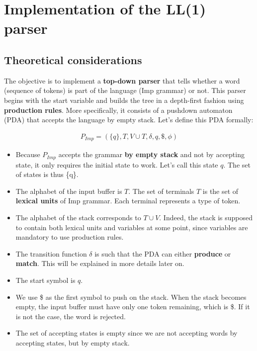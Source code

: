 \section{Implementation of the LL(1) parser}

\subsection{Theoretical considerations}

The objective is to implement a \textbf{top-down parser} that tells whether a word (sequence of tokens)
is part of the language (Imp grammar) or not. This parser begins with the start variable and builds the
tree in a depth-first fashion using \textbf{production rules}. More specifically, it consists of a pushdown
automaton (PDA) that accepts the language by empty stack. Let's define this PDA formally:

\begin{equation}
  \begin{split}
    P_{Imp} = (\{q\}, T, V \cup T, \delta, q, \$, \phi)
   \end{split}
\end{equation}

\begin{itemize}
  \item Because $P_{Imp}$ accepts the grammar \textbf{by empty stack} and not by accepting state, it only requires the initial state to work. 
        Let's call this state $q$. The set of states is thus \{q\}.
  \item The alphabet of the input buffer is $T$. The set of terminals $T$ is the set of \textbf{lexical units} of Imp grammar. 
        Each terminal represents a type of token.
  \item The alphabet of the stack corresponds to $T \cup V$. Indeed, the stack is supposed to contain both lexical units and variables
        at some point, since variables are mandatory to use production rules.
  \item The transition function $\delta$ is such that the PDA can either \textbf{produce} or \textbf{match}. This will be explained
        in more details later on.
  \item The start symbol is $q$.
  \item We use \$ as the first symbol to push on the stack. When the stack becomes empty, the input buffer must have only one token
        remaining, which is \$. If it is not the case, the word is rejected.
  \item The set of accepting states is empty since we are not accepting words by accepting states, but by empty stack.
\end{itemize}

